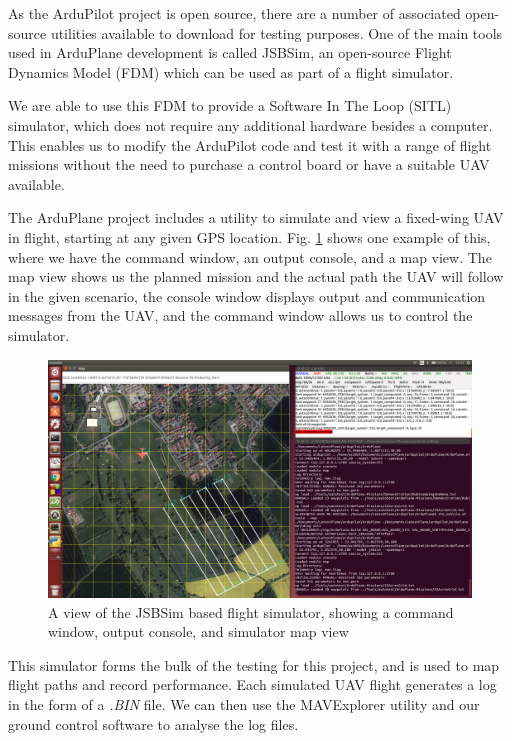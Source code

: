 As the ArduPilot project is open source, there are a number of associated open-source utilities available to download for testing purposes. One of the main tools used in ArduPlane development is called JSBSim, an open-source Flight Dynamics Model (FDM) which can be used as part of a flight simulator. %

We are able to use this FDM to provide a Software In The Loop (SITL) simulator, which does not require any additional hardware besides a computer. This enables us to modify the ArduPilot code and test it with a range of flight missions without the need to purchase a control board or have a suitable UAV available. 

The ArduPlane project includes a utility to simulate and view a fixed-wing UAV in flight, starting at any given GPS location. Fig. \ref{fig:jsbsim} shows one example of this, where we have the command window, an output console, and a map view. The map view shows us the planned mission and the actual path the UAV will follow in the given scenario, the console window displays output and communication messages from the UAV, and the command window allows us to control the simulator.

\begin{figure}[htbp!] 
\centering    
\includegraphics[width=\textwidth]{JSBSim}
\caption[JSBSim Simulator]{A view of the JSBSim based flight simulator, showing a command window, output console, and simulator map view}
\label{fig:jsbsim}
\end{figure}

This simulator forms the bulk of the testing for this project, and is used to map flight paths and record performance. Each simulated UAV flight generates a log in the form of a \textit{.BIN} file. We can then use the MAVExplorer utility and our ground control software to analyse the log files. 

